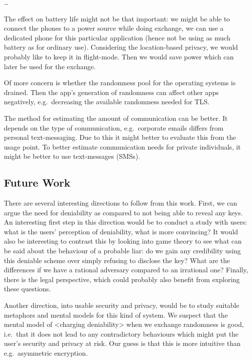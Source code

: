 \dots

The effect on battery life might not be that important: we might be able to 
connect the phones to a power source while doing exchange, we can use 
a dedicated phone for this particular application (hence not be using as much 
battery as for ordinary use).
Considering the location-based privacy, we would probably like to keep it in 
flight-mode.
Then we would save power which can later be used for the exchange.

Of more concern is whether the randomness pool for the operating systems is 
drained.
Then the app's generation of randomness can affect other apps negatively, 
e.g.~decreasing the available randomness needed for TLS\@.

The method for estimating the amount of communication can be better.
It depends on the type of communication, e.g.~corporate emails differs from 
personal text-messaging.
Due to this it might better to evaluate this from the usage point.
To better estimate communication needs for private individuals, it might be 
better to use text-messages (SMSs).

\subsection{Future Work}

There are several interesting directions to follow from this work.
First, we can argue the need for deniability as compared to not being able to 
reveal any keys.
An interesting first step in this direction would be to conduct a study with 
users: what is the users' perception of deniability, what is more convincing?
It would also be interesting to contrast this by looking into game theory to 
see what can be said about the behaviour of a probable liar: do we gain any 
credibility using this deniable scheme over simply refusing to disclose the 
key?
What are the differences if we have a rational adversary compared to an 
irrational one?
Finally, there is the legal perspective, which could probably also benefit from 
exploring these questions.

Another direction, into usable security and privacy, would be to study suitable 
metaphors and mental models for this kind of system.
We suspect that the mental model of <charging deniability> when we exchange 
randomness is good, i.e.~that it does not lead to any contradictory behaviours 
which might put the user's security and privacy at risk.
Our guess is that this is more intuitive than e.g.~asymmetric encryption.

